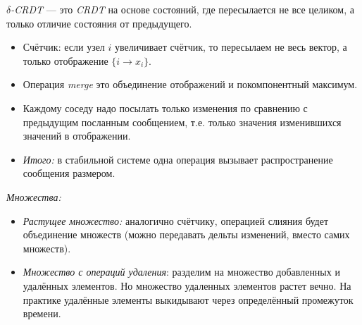 \begin{definition}
    $\delta$\textit{-CRDT} --- это \textit{CRDT} на основе состояний, где пересылается не
    все целиком, а только отличие состояния от предыдущего.
\end{definition}

\begin{example}
    \enewline
    \begin{itemize}
        \item Счётчик: если узел $i$ увеличивает счётчик, то пересылаем не весь вектор,
            а только отображение $\{i \to x_i\}$.
        \item Операция \textit{merge} это объединение отображений и покомпонентный максимум.
        \item Каждому соседу надо посылать только изменения по сравнению с предыдущим посланным
            сообщением, т.е. только значения изменившихся значений в отображении.
        \item \textit{Итого:} в стабильной системе одна операция вызывает распространение
            сообщения размером.
    \end{itemize}
\end{example}

\begin{examples} \textit{Множества:}
    \begin{itemize}
        \item \textit{Растущее множество:} аналогично счётчику, операцией слияния будет
            объединение множеств (можно передавать дельты изменений, вместо самих множеств).
        \item \textit{Множество с операций удаления}: разделим на множество добавленных и
            удалённых элементов. Но множество удаленных элементов растет вечно. На практике
            удалённые элементы выкидывают через определённый промежуток времени.
    \end{itemize}
\end{examples}
